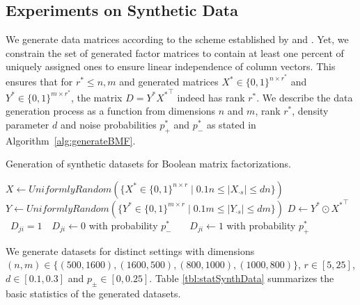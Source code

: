\subsection{Experiments on Synthetic Data} \label{sec:MDL:SynthData}
We generate data matrices according to the scheme established by \cite{miettinen2014mdl4bmf,karaev2015getting} and \cite{lucchese2014unifying}. Yet, we constrain the set of generated factor matrices to contain at least one percent of uniquely assigned ones to ensure linear independence of column vectors. This ensures that for $r^*\leq n,m$ and generated matrices $X^*\in\{0,1\}^{n\times r^*}$ and $Y^*\in\{0,1\}^{m\times r^*}$, the matrix $D=Y^* {X^*}^\top $ indeed has rank $r^*$. We describe the data generation process as a function from dimensions $n$ and $m$, rank $r^*$, density parameter $d$ and noise probabilities $p_+^*$ and $p_-^*$ as stated in Algorithm~\ref{alg:generateBMF}. 
\begin{algorithm}[t]
\caption{Generation of synthetic datasets for Boolean matrix factorizations.}
\begin{algorithmic}[1]
  	\State $X\gets UniformlyRandom(\{X^*\in\{0,1\}^{n\times r}\mid 0.1n\leq|X_{\cdot s}|\leq dn\})$
  	\State $Y\gets UniformlyRandom(\{Y^*\in\{0,1\}^{m\times r}\mid 0.1m\leq|Y_{\cdot s}|\leq dm\})$
  	\State $D\gets Y^*\odot {X^*}^\top$
  	    \State \algorithmicif\ $D_{ji}=1$\ \algorithmicthen\ $D_{ji}\gets 0$ with probability $p_-^*$ 
  	    \State {}\ \algorithmicelse\ \ $D_{ji}\gets 1$ with probability $p_+^*$ 
    \EndFor
  \EndFunction
\end{algorithmic}
\label{alg:MDL:generateBMF}
\end{algorithm}
We generate datasets for distinct settings with dimensions $(n,m)\in\{(500,1600),\allowbreak(1600,500),\allowbreak(800,1000),\allowbreak(1000,800)\}$, $r\in[5,25]$, $d\in [0.1,0.3]$ and $p_\pm\in [0,0.25]$. 
Table \ref{tbl:statSynthData} summarizes the basic statistics of the generated datasets.   
